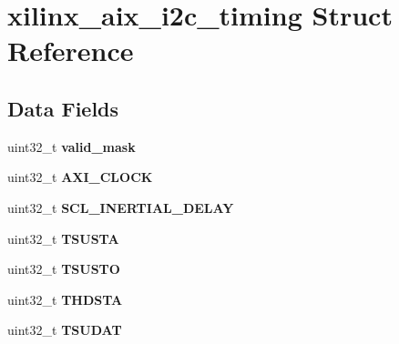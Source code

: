 \hypertarget{structxilinx__aix__i2c__timing}{}\section{xilinx\+\_\+aix\+\_\+i2c\+\_\+timing Struct Reference}
\label{structxilinx__aix__i2c__timing}
\subsection*{Data Fields}
\begin{DoxyCompactItemize}
\item 
\mbox{\label{structxilinx__aix__i2c__timing_a1e74cc767383dd9a2bbf5722de162a81}} 
uint32\+\_\+t {\bfseries valid\+\_\+mask}
\item 
\mbox{\label{structxilinx__aix__i2c__timing_afc6054d60d11a5454ae83076cb410145}} 
uint32\+\_\+t {\bfseries A\+X\+I\+\_\+\+C\+L\+O\+CK}
\item 
\mbox{\label{structxilinx__aix__i2c__timing_a01011eec18f1ee01aef4cb1f775f1663}} 
uint32\+\_\+t {\bfseries S\+C\+L\+\_\+\+I\+N\+E\+R\+T\+I\+A\+L\+\_\+\+D\+E\+L\+AY}
\item 
\mbox{\label{structxilinx__aix__i2c__timing_a17a5ecc2b85bc04d5fd4c19198703f55}} 
uint32\+\_\+t {\bfseries T\+S\+U\+S\+TA}
\item 
\mbox{\label{structxilinx__aix__i2c__timing_a0e4db31c2185e968fe203a9b7e2c3900}} 
uint32\+\_\+t {\bfseries T\+S\+U\+S\+TO}
\item 
\mbox{\label{structxilinx__aix__i2c__timing_a51349f4be72525e66df692a75c70c279}} 
uint32\+\_\+t {\bfseries T\+H\+D\+S\+TA}
\item 
\mbox{\label{structxilinx__aix__i2c__timing_ab5cdce8759ed7d9690d08261046ca254}} 
uint32\+\_\+t {\bfseries T\+S\+U\+D\+AT}
\item 
\mbox{\label{structxilinx__aix__i2c__timing_a741267952c279a26469c34f5b4c1af26}} 

\end{DoxyCompactItemize}

